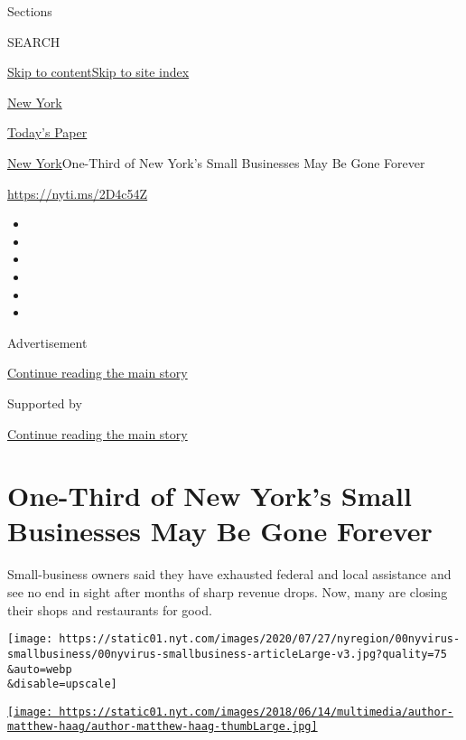 Sections

SEARCH

\protect\hyperlink{site-content}{Skip to
content}\protect\hyperlink{site-index}{Skip to site index}

\href{https://www.nytimes.com/section/nyregion}{New York}

\href{https://myaccount.nytimes.com/auth/login?response_type=cookie\&client_id=vi}{}

\href{https://www.nytimes.com/section/todayspaper}{Today's Paper}

\href{/section/nyregion}{New York}\textbar{}One-Third of New York's
Small Businesses May Be Gone Forever

\url{https://nyti.ms/2D4c54Z}

\begin{itemize}
\item
\item
\item
\item
\item
\item
\end{itemize}

Advertisement

\protect\hyperlink{after-top}{Continue reading the main story}

Supported by

\protect\hyperlink{after-sponsor}{Continue reading the main story}

\hypertarget{one-third-of-new-yorks-small-businesses-may-be-gone-forever}{%
\section{One-Third of New York's Small Businesses May Be Gone
Forever}\label{one-third-of-new-yorks-small-businesses-may-be-gone-forever}}

Small-business owners said they have exhausted federal and local
assistance and see no end in sight after months of sharp revenue drops.
Now, many are closing their shops and restaurants for good.

\texttt{[image: https://static01.nyt.com/images/2020/07/27/nyregion/00nyvirus-smallbusiness/00nyvirus-smallbusiness-articleLarge-v3.jpg?quality=75\\\&auto=webp\\\&disable=upscale]}

\href{https://www.nytimes.com/by/matthew-haag}{\texttt{[image: https://static01.nyt.com/images/2018/06/14/multimedia/author-matthew-haag/author-matthew-haag-thumbLarge.jpg]}}

